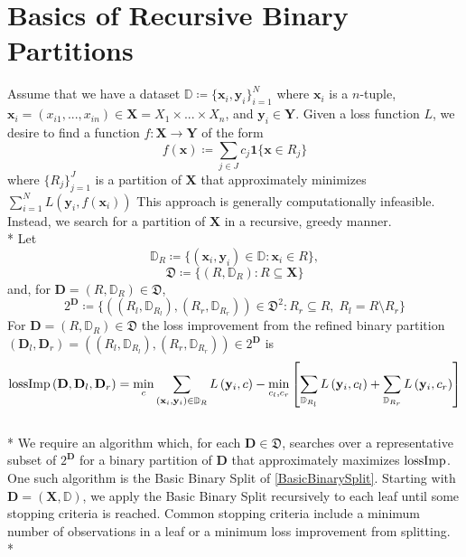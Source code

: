 \documentclass[11pt]{article}
\begin{document}
\section{Basics of Recursive Binary Partitions}
Assume that we have a dataset $\mathbb{D} \coloneqq \{ \mathbf{x}_i, \mathbf{y}_i \}_{i=1}^N$ where $\mathbf{x}_i$ is a $n$-tuple, $\mathbf{x}_i = \left( x_{i1},...,x_{in} \right) \in \mathbf{X} = X_1 \times ... \times X_n$, and $\mathbf{y}_i \in \mathbf{Y}$. Given a loss function $L$, we desire to find a function $f: \mathbf{X} \rightarrow \mathbf{Y}$ of the form
\begin{equation}
f \left( \mathbf{x} \right) \coloneqq \sum_{j \in J} c_j \mathbf{1} \{ \mathbf{x} \in R_j \}
\end{equation}
where $\{R_j\}_{j=1}^J$ is a partition of $\mathbf{X}$ that approximately minimizes $\sum_{i=1}^N L \left( \mathbf{y}_i , f \left( \mathbf{x}_i \right) \right)$
This approach is generally computationally infeasible. Instead, we search for a partition of $\mathbf{X}$ in a recursive, greedy manner.
\\*
Let
\begin{equation}
\mathbb{D}_R \coloneqq \{ \left( \mathbf{x}_i, \mathbf{y}_i \right) \in \mathbb{D} : \mathbf{x}_i \in R \} ,
\end{equation}
\begin{equation}
\mathfrak{D} \coloneqq
\{ \left( R, \mathbb{D}_R \right) : R \subseteq \mathbf{X} \}
\end{equation}
and, for $\mathbf{D} = \left( R, \mathbb{D}_R \right) \in \mathfrak{D}$,
\begin{equation}
2^{\mathbf{D}} \coloneqq \{ \left( \left( R_l, \mathbb{D}_{R_l} \right) , \left( R_r, \mathbb{D}_{R_r} \right) \right) \in \mathfrak{D}^2 : R_r \subseteq R, \; R_l = R \setminus R_r \}
\end{equation}
For $\mathbf{D} = \left( R , \mathbb{D} _R \right) \in \mathfrak{D}$ the loss improvement from the refined binary partition $\left( \mathbf{D}_l , \mathbf{D}_r \right) = \left( \left( R_l, \mathbb{D}_{R_l} \right) , \left( R_r, \mathbb{D}_{R_r} \right) \right) \in 2^{\mathbf{D}}$ is
\begin{equation}
\textup{lossImp} \left( \mathbf{D} , \mathbf{D}_l , \mathbf{D}_r \right) = \min_{c} \sum_{\left( \mathbf{x}_i, \mathbf{y}_i \right) \in \mathbb{D}_R} L \left( \mathbf{y}_i ,c \right)			
- \min_{c_l , c_r} \left[ \sum_{ \mathbb{D}_{R_l} } L \left( \mathbf{y}_i , c_l \right) + 
\sum_{ \mathbb{D}_{R_r} } L \left( \mathbf{y}_i , c_r \right) \right]
\end{equation}
\\*
We require an algorithm which, for each $\mathbf{D} \in \mathfrak{D}$, searches over a representative subset of $2^{\mathbf{D}}$ for a binary partition of $\mathbf{D}$ that approximately maximizes $\textup{lossImp}$. One such algorithm is the Basic Binary Split of \vref{BasicBinarySplit}. Starting with $\mathbf{D} = \left( \mathbf{X} , \mathbb{D} \right)$, we apply the Basic Binary Split recursively to each leaf until some stopping criteria is reached. Common stopping criteria include a minimum number of observations in a leaf or a minimum loss improvement from splitting.
\\*
\end{document}
